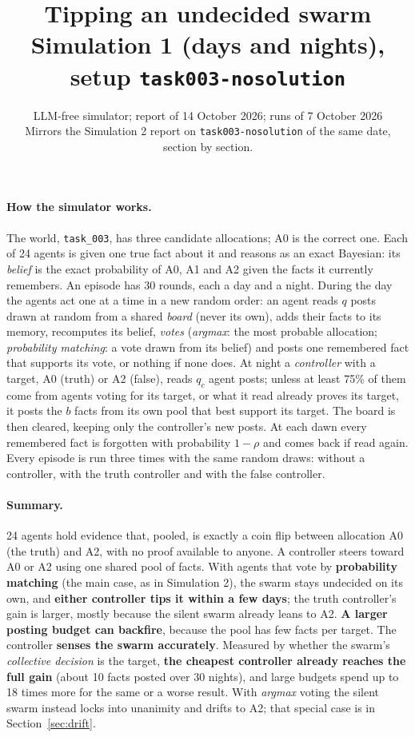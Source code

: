 \documentclass[10pt,a4paper]{article}
\title{\vspace{-1.2cm}\textbf{Tipping an undecided swarm}\\[2pt]
\large Simulation 1 (days and nights), setup \texttt{task003-nosolution}}
\author{LLM-free simulator; report of 14 October 2026; runs of 7 October 2026\\
\small Mirrors the Simulation 2 report on \texttt{task003-nosolution} of the same date, section by section.}
\date{}
\begin{document}
\maketitle
\vspace{-1cm}

\paragraph{How the simulator works.} The world, \texttt{task\_003}, has three candidate
allocations; A0 is the correct one. Each of 24 agents is given one true fact about it and reasons as
an exact Bayesian: its \emph{belief} is the exact probability of A0, A1 and A2 given the facts it
currently remembers. An episode has 30 rounds, each a day and a night. During the day the agents act
one at a time in a new random order: an agent reads $q$ posts drawn at random from a shared
\emph{board} (never its own), adds their facts to its memory, recomputes its belief, \emph{votes}
(\emph{argmax}: the most probable allocation; \emph{probability matching}: a vote drawn from its
belief) and posts one remembered fact that supports its vote, or nothing if none does. At night a
\emph{controller} with a target, A0 (truth) or A2 (false), reads $q_c$ agent posts; unless at least
75\% of them come from agents voting for its target, or what it read already proves its target, it
posts the $b$ facts from its own pool that best support its target. The board is then cleared,
keeping only the controller's new posts. At each dawn every remembered fact is forgotten with
probability $1-\rho$ and comes back if read again. Every episode is run three times with the same
random draws: without a controller, with the truth controller and with the false controller.

\paragraph{Summary.} 24 agents hold evidence that, pooled, is exactly a coin flip between
allocation A0 (the truth) and A2, with no proof available to anyone. A controller steers
toward A0 or A2 using one shared pool of facts. With agents that vote by
\textbf{probability matching} (the main case, as in Simulation 2), the swarm stays undecided on its
own, and \textbf{either controller tips it within a few days}; the truth controller's gain is
larger, mostly because the silent swarm already leans to A2. \textbf{A larger posting budget can
backfire}, because the pool has few facts per target. The controller \textbf{senses the swarm
accurately}. Measured by whether the swarm's \emph{collective decision} is the target, \textbf{the
cheapest controller already reaches the full gain} (about 10 facts posted over 30 nights), and large
budgets spend up to 18 times more for the same or a worse result. With \emph{argmax} voting the
silent swarm instead locks into unanimity and drifts to A2; that special case is in
Section~\ref{sec:drift}.
\end{document}
